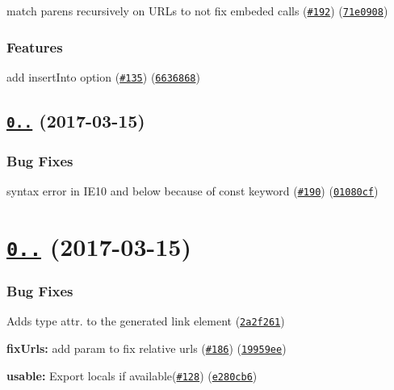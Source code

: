 \begin{DoxyItemize}
\item match parens recursively on U\+R\+Ls to not fix embeded calls (\href{https://github.com/webpack/style-loader/issues/192}{\tt \#192}) (\href{https://github.com/webpack/style-loader/commit/71e0908}{\tt 71e0908})
\end{DoxyItemize}

\subsubsection*{Features}


\begin{DoxyItemize}
\item add insert\+Into option (\href{https://github.com/webpack/style-loader/issues/135}{\tt \#135}) (\href{https://github.com/webpack/style-loader/commit/6636868}{\tt 6636868})
\end{DoxyItemize}

\label{_0.14.1}%
 \subsection*{\href{https://github.com/webpack/style-loader/compare/v0.14.0...v0.14.1}{\tt 0..} (2017-\/03-\/15)}

\subsubsection*{Bug Fixes}


\begin{DoxyItemize}
\item syntax error in I\+E10 and below because of {\ttfamily const} keyword (\href{https://github.com/webpack/style-loader/issues/190}{\tt \#190}) (\href{https://github.com/webpack/style-loader/commit/01080cf}{\tt 01080cf})
\end{DoxyItemize}

\label{_0.14.0}%
 \section*{\href{https://github.com/webpack/style-loader/compare/v0.13.1...v0.14.0}{\tt 0..} (2017-\/03-\/15)}

\subsubsection*{Bug Fixes}


\begin{DoxyItemize}
\item Adds type attr. to the generated link element (\href{https://github.com/webpack/style-loader/commit/2a2f261}{\tt 2a2f261})
\item {\bfseries fix\+Urls\+:} add param to fix relative urls (\href{https://github.com/webpack/style-loader/issues/186}{\tt \#186}) (\href{https://github.com/webpack/style-loader/commit/19959ee}{\tt 19959ee})
\item {\bfseries usable\+:} Export locals if available(\href{https://github.com/webpack/style-loader/issues/128}{\tt \#128}) (\href{https://github.com/webpack/style-loader/commit/e280cb6}{\tt e280cb6})
\end{DoxyItemize}

